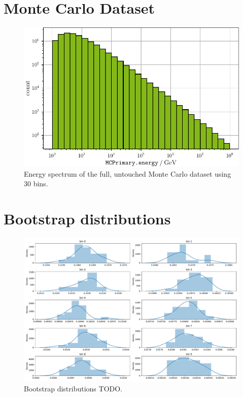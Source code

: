 \clearpage
\section{Monte Carlo Dataset}
\begin{figure}
  \centering
  \includegraphics[scale=1]{content/plots/dataset:raw:histogram_full.pdf}
  \caption{Energy spectrum of the full, untouched Monte Carlo dataset using 30 bins.}
  \label{fig:dataset:raw:histogram}
\end{figure}


\clearpage
\section{Bootstrap distributions}
\begin{figure}
  \centering
  \includegraphics[width=\textwidth]{content/plots/halftime/bootstrap_distributions.pdf}
  \caption{Bootstrap distributions TODO.}
  \label{fig:bootstrap:distributions}
\end{figure}


